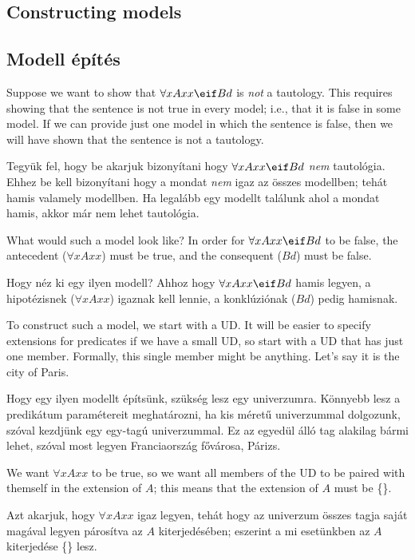 \subsection*{Constructing models}
\subsection{Modell építés}

Suppose we want to show that $\forall xAxx \eif Bd$ is \emph{not} a tautology. This requires showing that the sentence is not true in every model; i.e., that it is false in some model. If we can provide just one model in which the sentence is false, then we will have shown that the sentence is not a tautology.

Tegyük fel, hogy be akarjuk bizonyítani hogy $\forall xAxx \eif Bd$ \emph{nem} tautológia. Ehhez be kell bizonyítani hogy a mondat \emph{nem} igaz az összes modellben; tehát hamis valamely modellben. Ha legalább egy modellt találunk ahol a mondat hamis, akkor már nem lehet tautológia.

What would such a model look like? In order for $\forall xAxx \eif Bd$ to be false, the antecedent ($\forall x Axx$) must be true, and the consequent ($Bd$) must be false.

Hogy néz ki egy ilyen modell? Ahhoz hogy $\forall xAxx \eif Bd$ hamis legyen, a hipotézisnek ($\forall x Axx$) igaznak kell lennie, a konklúziónak ($Bd$) pedig hamisnak.

To construct such a model, we start with a UD. It will be easier to specify extensions for predicates if we have a small UD, so start with a UD that has just one member. Formally, this single member might be anything. Let's say it is the city of Paris.

Hogy egy ilyen modellt építsünk, szükség lesz egy univerzumra. Könnyebb lesz a predikátum paramétereit meghatározni, ha kis méretű univerzummal dolgozunk, szóval kezdjünk egy egy-tagú univerzummal. Ez az egyedül álló tag alakilag bármi lehet, szóval most legyen Franciaország fővárosa, Párizs.

We want $\forall x Axx$ to be true, so we want all members of the UD to be paired with themself in the extension of $A$; this means that the extension of $A$ must be \{\}.

Azt akarjuk, hogy $\forall x Axx$ igaz legyen, tehát hogy az univerzum összes tagja saját magával legyen párosítva az $A$ kiterjedésében; eszerint a mi esetünkben az $A$ kiterjedése \{\} lesz.

